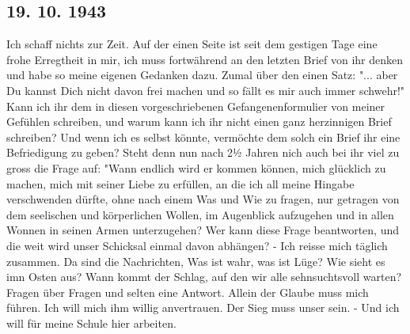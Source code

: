 \subsection{19. 10. 1943}

Ich schaff nichts zur Zeit.
Auf der einen Seite ist seit dem gestigen Tage eine frohe Erregtheit in mir, ich muss fortw\"{a}hrend an den letzten Brief von ihr denken und habe so meine eigenen Gedanken dazu.
Zumal \"{u}ber den einen Satz: "... aber Du kannst Dich nicht davon frei machen und so f\"{a}llt es mir auch immer schwehr!"
Kann ich ihr dem in diesen vorgeschriebenen Gefangenenformulier von meiner Gef\"{u}hlen schreiben, und warum kann ich ihr nicht einen ganz herzinnigen Brief schreiben?
Und wenn ich es selbst k\"{o}nnte, verm\"{o}chte dem solch ein Brief ihr eine Befriedigung zu geben?
Steht denn nun nach 2½ Jahren nich auch bei ihr viel zu gross die Frage auf: "Wann endlich wird er kommen k\"{o}nnen, mich gl\"{u}cklich zu machen, mich mit seiner Liebe zu erf\"{u}llen, an die ich all meine Hingabe verschwenden d\"{u}rfte, ohne nach einem Was und Wie zu fragen, nur getragen von dem seelischen und k\"{o}rperlichen Wollen, im Augenblick aufzugehen und in allen Wonnen in seinen Armen unterzugehen?
Wer kann diese Frage beantworten, und die weit wird unser Schicksal einmal davon abh\"{a}ngen?
- Ich reisse mich t\"{a}glich zusammen.
Da sind die Nachrichten,
Was ist wahr, was ist L\"{u}ge?
Wie sieht es imn Osten aus?
Wann kommt der Schlag, auf den wir alle sehnsuchtsvoll warten?
Fragen \"{u}ber Fragen und selten eine Antwort.
Allein der Glaube muss mich f\"{u}hren.
Ich will mich ihm willig anvertrauen.
Der Sieg muss unser sein.
- Und ich will f\"{u}r meine Schule hier arbeiten.

\clearpage
